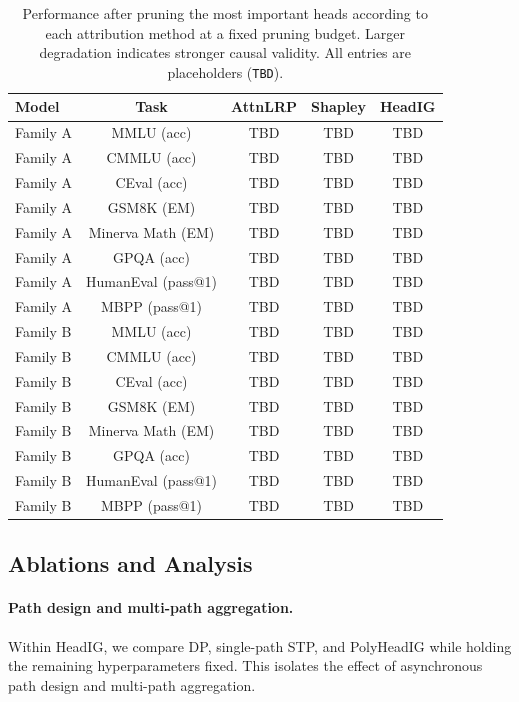 \begin{table}[t]
\centering
\caption{Performance after pruning the most important heads according to each attribution method at a fixed pruning budget. Larger degradation indicates stronger causal validity. All entries are placeholders (\texttt{TBD}).}
\label{tab:mask_main}
\begin{tabular}{lcccc}
\hline
\textbf{Model} & \textbf{Task} & \textbf{AttnLRP} & \textbf{Shapley} & \textbf{HeadIG} \\
\hline
Family A & MMLU (acc) & TBD & TBD & TBD \\
Family A & CMMLU (acc) & TBD & TBD & TBD \\
Family A & CEval (acc) & TBD & TBD & TBD \\
Family A & GSM8K (EM) & TBD & TBD & TBD \\
Family A & Minerva Math (EM) & TBD & TBD & TBD \\
Family A & GPQA (acc) & TBD & TBD & TBD \\
Family A & HumanEval (pass@1) & TBD & TBD & TBD \\
Family A & MBPP (pass@1) & TBD & TBD & TBD \\
Family B & MMLU (acc) & TBD & TBD & TBD \\
Family B & CMMLU (acc) & TBD & TBD & TBD \\
Family B & CEval (acc) & TBD & TBD & TBD \\
Family B & GSM8K (EM) & TBD & TBD & TBD \\
Family B & Minerva Math (EM) & TBD & TBD & TBD \\
Family B & GPQA (acc) & TBD & TBD & TBD \\
Family B & HumanEval (pass@1) & TBD & TBD & TBD \\
Family B & MBPP (pass@1) & TBD & TBD & TBD \\
\hline
\end{tabular}
\end{table}

\subsection{Ablations and Analysis}
\label{sec:exp:ablations}

\paragraph{Path design and multi-path aggregation.}
Within HeadIG, we compare DP, single-path STP, and PolyHeadIG while holding the remaining hyperparameters fixed. This isolates the effect of asynchronous path design and multi-path aggregation.

